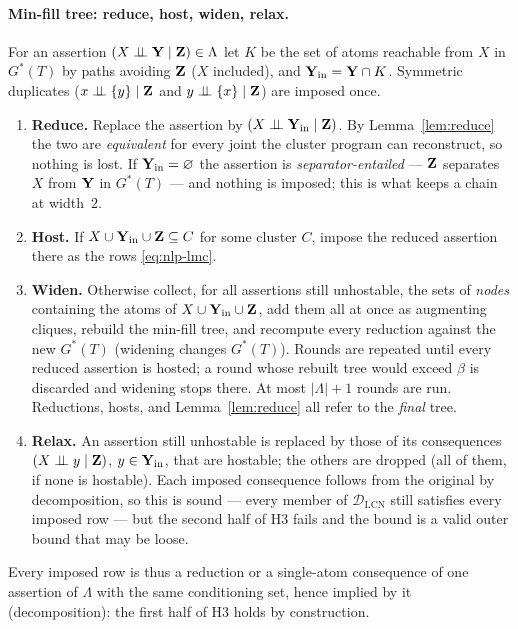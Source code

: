 \documentclass{article} %
\newcommand{\indep}{\perp\!\!\!\perp}
\newcommand{\DLCN}{\mathcal{D}_{\mathrm{LCN}}}
\begin{document}
\paragraph{Min-fill tree: reduce, host, widen, relax.}
For an assertion $(X\indep \bY\mid \bZ)\in\Lambda$ let $K$ be the set of atoms
reachable from $X$ in $G^\ast(T)$ by paths avoiding $\mathbf{Z}$ ($X$ included), and
$\mathbf{Y}_{\mathrm{in}}=\mathbf{Y}\cap K$. Symmetric duplicates ($x\indep\{y\}\mid\bZ$ and
$y\indep\{x\}\mid\bZ$) are imposed once.
\begin{enumerate}
  \item \textbf{Reduce.} Replace the assertion by $(X\indep \bY_{\mathrm{in}}\mid \bZ)$.
    By Lemma~\ref{lem:reduce} the two are \emph{equivalent} for every joint the
    cluster program can reconstruct, so nothing is lost. If
    $\mathbf{Y}_{\mathrm{in}}=\varnothing$ the assertion is \emph{separator-entailed} ---
    $\mathbf{Z}$ separates $X$ from $\mathbf{Y}$ in $G^\ast(T)$ --- and nothing is imposed; this is
    what keeps a chain at width~$2$.
  \item \textbf{Host.} If $X\cup \mathbf{Y}_{\mathrm{in}}\cup \mathbf{Z}\subseteq C$ for some
    cluster $C$, impose the reduced assertion there as the rows
    \eqref{eq:nlp-lmc}.
  \item \textbf{Widen.} Otherwise collect, for all assertions still unhostable,
    the sets of \emph{nodes} containing the atoms of $X\cup \mathbf{Y}_{\mathrm{in}}\cup \mathbf{Z}$, add them
    all at once as augmenting cliques, rebuild the min-fill tree, and recompute
    every reduction against the new $G^\ast(T)$ (widening changes $G^\ast(T)$).
    Rounds are repeated until every reduced assertion is hosted; a round whose
    rebuilt tree would exceed $\beta$ is discarded and widening stops there. At
    most $|\Lambda|+1$ rounds are run. Reductions, hosts, and
    Lemma~\ref{lem:reduce} all refer to the \emph{final} tree.
  \item \textbf{Relax.} An assertion still unhostable is replaced by those of its
    consequences $(X\indep y\mid \bZ)$, $y\in \mathbf{Y}_{\mathrm{in}}$, that are hostable; the
    others are dropped (all of them, if none is hostable). Each imposed
    consequence follows from the original by decomposition, so this is sound ---
    every member of $\DLCN$ still satisfies every imposed row --- but the second
    half of H3 fails and the bound is a valid outer bound that may be loose.
\end{enumerate}
Every imposed row is thus a reduction or a single-atom consequence of one
assertion of $\Lambda$ with the same conditioning set, hence implied by it
(decomposition): the first half of H3 holds by construction.
\end{document}
